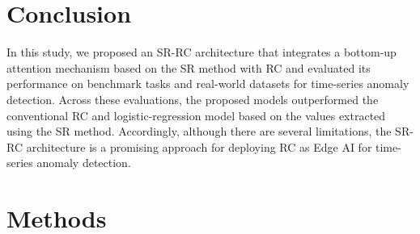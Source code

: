 \documentclass[pdflatex,sn-nature]{sn-jnl}
\theoremstyle{thmstyleone}%
\theoremstyle{thmstyletwo}%
\theoremstyle{thmstylethree}%
\begin{document}
\section*{Conclusion}
In this study, we proposed an SR-RC architecture that integrates a bottom-up attention mechanism based on the SR method with RC and evaluated its performance on benchmark tasks and real-world datasets for time-series anomaly detection. 
Across these evaluations, the proposed models outperformed the conventional RC and logistic-regression model based on the values extracted using the SR method.
Accordingly, although there are several limitations, the SR-RC architecture is a promising approach for deploying RC as Edge AI for time-series anomaly detection.

\section*{Methods}
\end{document}
